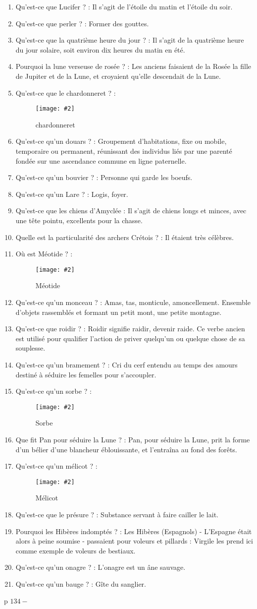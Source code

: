 \documentclass[a4paper, 11pt, hidelinks]{article}
\newcommand{\img}[4]{\begin{figure}[!ht]
    \centering
    \texttt{[image: \#2]}
    \caption{#3}
    \label{#4}
    \end{figure} }
\begin{document}
\begin{enumerate}
      \item Qu'est-ce que Lucifer ? : Il s'agit de l'étoile du matin et l'étoile du soir.
      \item Qu'est-ce que perler ? : Former des gouttes.
      \item Qu'est-ce que la quatrième heure du jour ? : Il s'agit de la quatrième heure du jour solaire, soit environ dix heures du matin en été.
      \item Pourquoi la lune verseuse de rosée ? : Les anciens faisaient de la Rosée la fille de Jupiter et de la Lune, et croyaient qu'elle descendait de la Lune.
      \item Qu'est-ce que le chardonneret ? :
            \img{0.2}{chardonneret.jpg}{chardonneret}{126}
      \item Qu'est-ce qu'un douars ? : Groupement d'habitations, fixe ou mobile, temporaire ou permanent, réunissant des individus liés par une parenté fondée sur une ascendance commune en ligne paternelle.
      \item Qu'est-ce qu'un bouvier ? : Personne qui garde les boeufs.
      \item Qu'est-ce qu'un Lare ? : Logis, foyer.
      \item Qu'est-ce que les chiens d'Amyclée : Il s'agit de chiens longs et minces, avec une tête pointu, excellents pour la chasse.
      \item Quelle est la particularité des archers Crétois ? : Il étaient très célèbres.
      \item Où est Méotide ? :
            \img{0.3}{Méotide.png}{Méotide}{127}
            \newpage
      \item Qu'est-ce qu'un monceau ? : Amas, tas, monticule, amoncellement. Ensemble d'objets rassemblés et formant un petit mont, une petite montagne.
      \item Qu'est-ce que roidir ? : Roidir signifie raidir, devenir raide. Ce verbe ancien est utilisé pour qualifier l'action de priver quelqu'un ou quelque chose de sa souplesse.
      \item Qu'est-ce qu'un bramement ? : Cri du cerf entendu au temps des amours destiné à séduire les femelles pour s'accoupler.
      \item Qu'est-ce qu'un sorbe ? : 
            \img{0.1}{Sorbe.jpg}{Sorbe}{128}
      \item Que fit Pan pour séduire la Lune ? : Pan, pour séduire la Lune, prit la forme d'un bélier d'une blancheur éblouissante, et l'entraîna au fond des forêts.
      \item Qu'est-ce qu'un mélicot ? :
            \img{1.5}{Mélicot.jpg}{Mélicot}{129}
      \item Qu'est-ce que le présure ? : Substance servant à faire cailler le lait.
      \item Pourquoi les Hibères indomptés ? : Les Hibères (Espagnols) - L'Espagne était alors à peine soumise - passaient pour voleurs et pillards : Virgile les prend ici comme exemple de voleurs de bestiaux.
      \item Qu'est-ce qu'un onagre ? : L'onagre est un âne sauvage.
      \item Qu'est-ce qu'un bauge ? : Gîte du sanglier.
\end{enumerate}


p $134 - $
\end{document}
